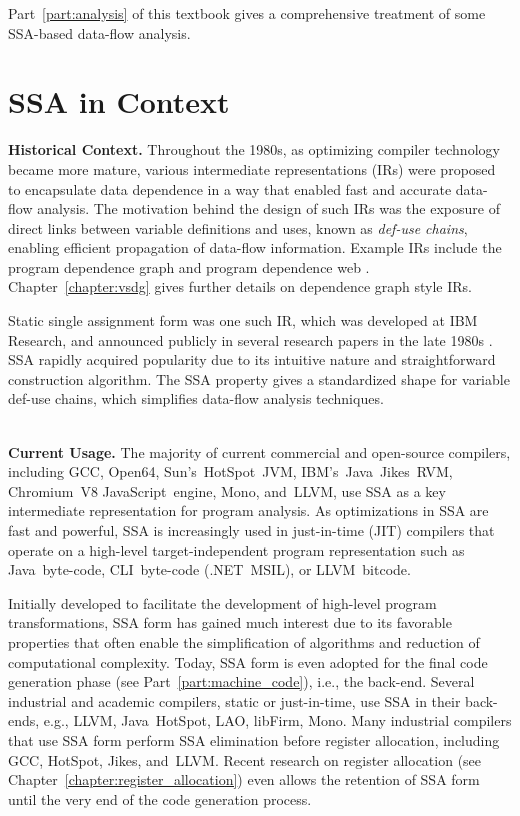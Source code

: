 Part~\ref{part:analysis} of this textbook gives a comprehensive treatment of some SSA-based data-flow analysis.




\section{SSA in Context}

\textbf{Historical Context.}
Throughout the 1980s, as optimizing compiler technology became more mature, various intermediate representations (IRs) were proposed to encapsulate data dependence in a way that enabled fast and accurate data-flow analysis. 
The motivation behind the design of such IRs was the exposure of direct links between variable definitions and uses, known as \textit{def-use chains}, enabling efficient propagation of data-flow information. 
Example IRs include the program dependence graph \cite{ferrante87program} and program dependence web \cite{ottenstein90program}. 
Chapter~\ref{chapter:vsdg} gives further details on dependence graph style IRs.

Static single assignment form was one such IR, which was developed at IBM Research, and announced publicly in several research papers in the late 1980s \cite{rosen88global,alpern88detecting,cytron89efficient}. 
SSA rapidly acquired popularity due to its intuitive nature and straightforward construction algorithm. 
The SSA property gives a standardized shape for variable def-use chains, which simplifies data-flow analysis techniques.

~\\ \textbf{Current Usage.}
The majority of current commercial and open-source compilers, including GCC, Open64, Sun's~HotSpot~JVM, IBM's~Java~Jikes~RVM, Chromium~V8 JavaScript~engine, Mono, and~LLVM, use SSA as a key intermediate representation for program analysis. 
As optimizations in SSA are fast and powerful, SSA is increasingly used in just-in-time (JIT) compilers that operate on a high-level target-independent program representation such as Java~byte-code, CLI~byte-code (.NET~MSIL), or LLVM~bitcode.



Initially developed to facilitate the development of high-level program transformations, SSA form has gained much interest due to its favorable properties that often enable the simplification of algorithms and reduction of computational complexity. 
Today, SSA form is even adopted for the final code generation phase (see Part~\ref{part:machine_code}), i.e., the back-end. 
Several industrial and academic compilers, static or just-in-time, use SSA in their back-ends, e.g., LLVM, Java~HotSpot, LAO, libFirm, Mono. 
Many industrial compilers that use SSA form perform SSA elimination before register allocation, including GCC, HotSpot, Jikes, and~LLVM. 
Recent research on register allocation (see Chapter~\ref{chapter:register_allocation}) even allows the retention of SSA form until the very end of the code generation process.

